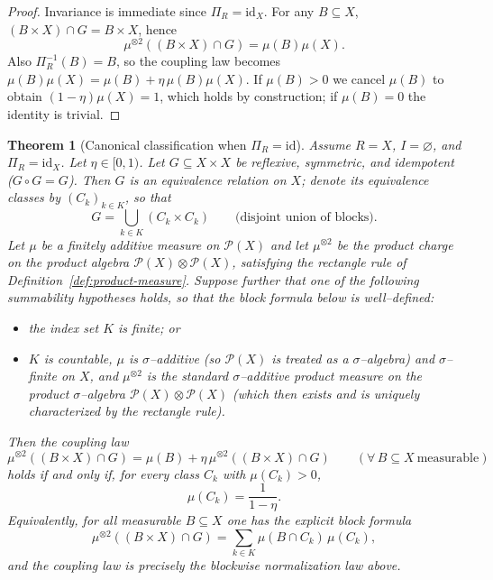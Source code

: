 \documentclass[11pt]{article}
\numberwithin{equation}{section}
\newtheorem{theorem}{Theorem}[section]
\theoremstyle{definition}
\begin{document}
\begin{proof}
Invariance is immediate since $\Pi_R=\mathrm{id}_X$. For any $B\subseteq X$, $(B\times X)\cap G=B\times X$, hence
\[
\mu^{\otimes 2}((B\times X)\cap G)=\mu(B)\mu(X).
\]
Also $\Pi_R^{-1}(B)=B$, so the coupling law becomes $\mu(B)\mu(X)=\mu(B)+\eta\,\mu(B)\mu(X)$.
If $\mu(B)>0$ we cancel $\mu(B)$ to obtain $(1-\eta)\mu(X)=1$, which holds by construction; if $\mu(B)=0$ the identity is trivial.
\end{proof}
\begin{theorem}[Canonical classification when $\Pi_R=\mathrm{id}$]\label{thm:pi-id-classification}
Assume $R=X$, $I=\varnothing$, and $\Pi_R=\mathrm{id}_X$. Let $\eta\in[0,1)$.
Let $G\subseteq X\times X$ be reflexive, symmetric, and idempotent ($G\circ G=G$).
Then $G$ is an equivalence relation on $X$; denote its equivalence classes by $(C_k)_{k\in K}$, so that
\[
G=\bigcup_{k\in K}(C_k\times C_k)\qquad\text{(disjoint union of blocks)}.
\]
Let $\mu$ be a finitely additive measure on $\mathcal P(X)$ and let $\mu^{\otimes2}$ be the product charge on the product algebra $\mathcal P(X)\otimes\mathcal P(X)$, satisfying the rectangle rule of Definition~\ref{def:product-measure}. Suppose further that one of the following summability hypotheses holds, so that the block formula below is well--defined:
\begin{itemize}[nosep]
\item[\emph{(K--fin)}] the index set $K$ is finite; or
\item[\emph{(K--ctbl)}] $K$ is countable, $\mu$ is $\sigma$--additive (so $\mathcal P(X)$ is treated as a $\sigma$--algebra) and $\sigma$--finite on $X$, and $\mu^{\otimes2}$ is the standard $\sigma$--additive product measure on the product $\sigma$--algebra $\mathcal P(X)\otimes\mathcal P(X)$ (which then exists and is uniquely characterized by the rectangle rule).
\end{itemize}
Then the coupling law
\[
\mu^{\otimes2}((B\times X)\cap G)=\mu(B)+\eta\,\mu^{\otimes2}((B\times X)\cap G)\qquad(\forall\,B\subseteq X\ \text{measurable})
\]
holds if and only if, for every class $C_k$ with $\mu(C_k)>0$,
\[
\mu(C_k)=\frac{1}{1-\eta}.
\]
Equivalently, for all measurable $B\subseteq X$ one has the explicit block formula
\[
\mu^{\otimes2}((B\times X)\cap G)=\sum_{k\in K}\mu(B\cap C_k)\,\mu(C_k),
\]
and the coupling law is precisely the blockwise normalization law above.
\end{theorem}
\end{document}
